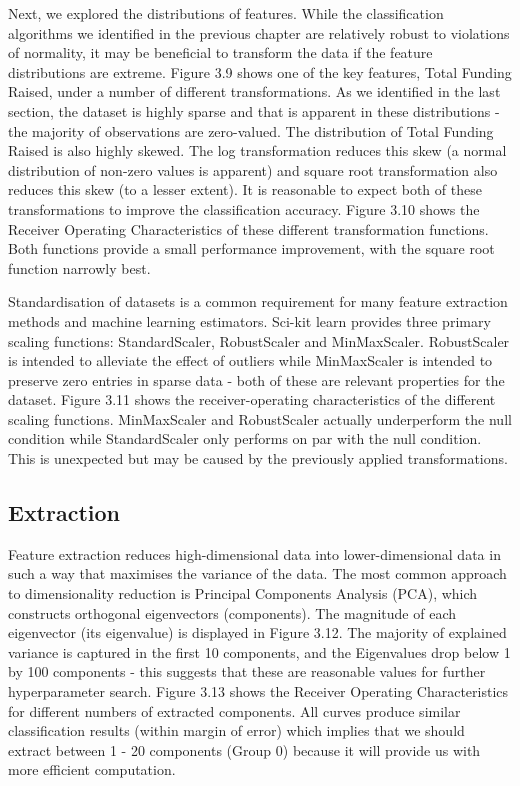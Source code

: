 \documentclass[../thesis/thesis.tex]{subfiles}
\begin{document}
Next, we explored the distributions of features. While the classification algorithms we identified in the previous chapter are relatively robust to violations of normality, it may be beneficial to transform the data if the feature distributions are extreme. Figure 3.9 shows one of the key features, Total Funding Raised, under a number of different transformations. As we identified in the last section, the dataset is highly sparse and that is apparent in these distributions - the majority of observations are zero-valued. The distribution of Total Funding Raised is also highly skewed. The log transformation reduces this skew (a normal distribution of non-zero values is apparent) and square root transformation also reduces this skew (to a lesser extent). It is reasonable to expect both of these transformations to improve the classification accuracy. Figure 3.10 shows the Receiver Operating Characteristics of these different transformation functions. Both functions provide a small performance improvement, with the square root function narrowly best.

Standardisation of datasets is a common requirement for many feature extraction methods and machine learning estimators. Sci-kit learn provides three primary scaling functions: StandardScaler, RobustScaler and MinMaxScaler. RobustScaler is intended to alleviate the effect of outliers while MinMaxScaler is intended to preserve zero entries in sparse data - both of these are relevant properties for the dataset. Figure 3.11 shows the receiver-operating characteristics of the different scaling functions. MinMaxScaler and RobustScaler actually underperform the null condition while StandardScaler only performs on par with the null condition. This is unexpected but may be caused by the previously applied transformations.

\subsection{Extraction}

Feature extraction reduces high-dimensional data into lower-dimensional data in such a way that maximises the variance of the data. The most common approach to dimensionality reduction is Principal Components Analysis (PCA), which constructs orthogonal eigenvectors (components). The magnitude of each eigenvector (its eigenvalue) is displayed in Figure 3.12. The majority of explained variance is captured in the first 10 components, and the Eigenvalues drop below 1 by 100 components - this suggests that these are reasonable values for further hyperparameter search. Figure 3.13 shows the Receiver Operating Characteristics for different numbers of extracted components. All curves produce similar classification results (within margin of error) which implies that we should extract between 1 - 20 components (Group 0) because it will provide us with more efficient computation.
\end{document}
